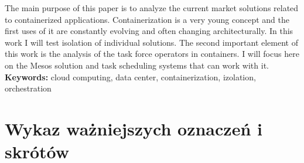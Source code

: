 \documentclass[10pt,a4paper,titlepage,twoside]{report}
\begin{document}
The main purpose of this paper is to analyze the current market solutions related to containerized applications. Containerization is a very young concept and the first uses of it are constantly evolving and often changing architecturally. In this work I will test isolation of individual solutions. The second important element of this work is the analysis of the task force operators in containers. I will focus here on the Mesos solution and task scheduling systems that can work with it.
\newline
\newline
\newline
\textbf{Keywords:} cloud computing, data center, containerization, izolation, orchestration

\newpage
{}

\tableofcontents


\newpage
{}
\section*{Wykaz ważniejszych oznaczeń i skrótów}
\end{document}
